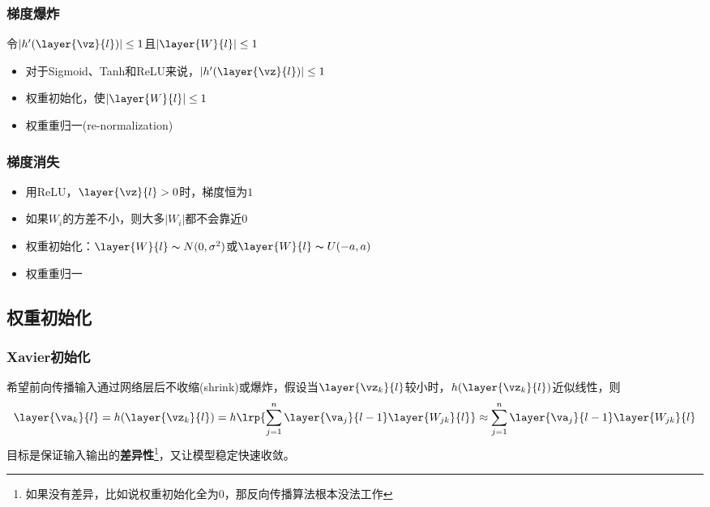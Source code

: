 \subsubsection{梯度爆炸}
令$|h'(\layer{\vz}{l})|\leq 1$且$|\layer{W}{l}|\leq 1$
\begin{itemize}
	\item 对于Sigmoid、Tanh和ReLU来说，$|h'(\layer{\vz}{l})|\leq 1$
	\item 权重初始化，使$|\layer{W}{l}|\leq 1$
	\item 权重重归一(re-normalization) %
\end{itemize}

\subsubsection{梯度消失}
\begin{itemize}
	\item 用ReLU，$\layer{\vz}{l}>0$时，梯度恒为$1$
	\item 如果$W_i$的方差不小，则大多$|W_i|$都不会靠近$0$
	\item 权重初始化：$\layer{W}{l}\thicksim N(0,\sigma^2)$或$\layer{W}{l}\thicksim U(-a,a)$
	\item 权重重归一
\end{itemize}

\subsection{权重初始化}
\subsubsection{Xavier初始化}
希望前向传播输入通过网络层后不收缩(shrink)或爆炸，假设当$\layer{\vz_k}{l}$较小时，$h(\layer{\vz_k}{l})$近似线性，则
\[\layer{\va_k}{l}=h(\layer{\vz_k}{l})
=h\lrp{\sum_{j=1}^n\layer{\va_j}{l-1}\layer{W_{jk}}{l}}
\approx\sum_{j=1}^n\layer{\va_j}{l-1}\layer{W_{jk}}{l}\]
目标是保证输入输出的\textbf{差异性}\footnote{如果没有差异，比如说权重初始化全为$0$，那反向传播算法根本没法工作}，又让模型稳定快速收敛。

